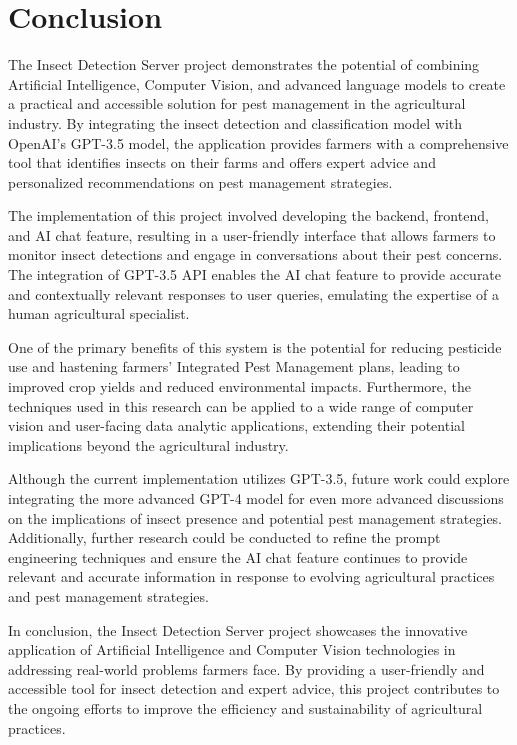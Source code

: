 \chapter{Conclusion}

The Insect Detection Server project demonstrates the potential of combining Artificial Intelligence, Computer Vision, and advanced language models to create a practical and accessible solution for pest management in the agricultural industry. By integrating the insect detection and classification model with OpenAI's GPT-3.5 model, the application provides farmers with a comprehensive tool that identifies insects on their farms and offers expert advice and personalized recommendations on pest management strategies.

The implementation of this project involved developing the backend, frontend, and AI chat feature, resulting in a user-friendly interface that allows farmers to monitor insect detections and engage in conversations about their pest concerns. The integration of GPT-3.5 API enables the AI chat feature to provide accurate and contextually relevant responses to user queries, emulating the expertise of a human agricultural specialist.

One of the primary benefits of this system is the potential for reducing pesticide use and hastening farmers' Integrated Pest Management plans, leading to improved crop yields and reduced environmental impacts. Furthermore, the techniques used in this research can be applied to a wide range of computer vision and user-facing data analytic applications, extending their potential implications beyond the agricultural industry.

Although the current implementation utilizes GPT-3.5, future work could explore integrating the more advanced GPT-4 model for even more advanced discussions on the implications of insect presence and potential pest management strategies. Additionally, further research could be conducted to refine the prompt engineering techniques and ensure the AI chat feature continues to provide relevant and accurate information in response to evolving agricultural practices and pest management strategies.

In conclusion, the Insect Detection Server project showcases the innovative application of Artificial Intelligence and Computer Vision technologies in addressing real-world problems farmers face. By providing a user-friendly and accessible tool for insect detection and expert advice, this project contributes to the ongoing efforts to improve the efficiency and sustainability of agricultural practices.

